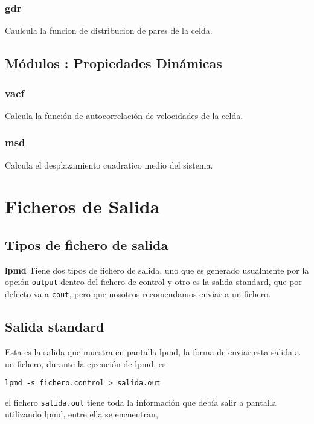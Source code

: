 \documentclass[a4paper,10pt]{scrbook}
\newcommand{\lpmd}{\textbf{lpmd }}
\newcommand{\control}[1]{\begin{center}\begin{minipage}{10cm}\texttt{#1}\end{minipage}\end{center}}
\begin{document}
\subsubsection{gdr}
Caulcula la funcion de distribucion de pares de la celda.

\subsection{M\'odulos : Propiedades Din\'amicas}
\subsubsection{vacf}
Calcula la funci\'on de autocorrelaci\'on de velocidades de la celda.
\subsubsection{msd}
Calcula el desplazamiento cuadratico medio del sistema.

\section{Ficheros de Salida}

\subsection{Tipos de fichero de salida}
\lpmd Tiene dos tipos de fichero de salida, uno que es generado usualmente por la opci\'on \verb|output| dentro del fichero de control y otro es la salida standard, que por defecto va a \verb|cout|, pero que nosotros recomendamos enviar a un fichero.

\subsection{Salida standard}
Esta es la salida que muestra en pantalla lpmd, la forma de enviar esta salida a un fichero, durante la ejecuci\'on de lpmd, es

\control{lpmd -s fichero.control > salida.out}

el fichero \verb|salida.out| tiene toda la informaci\'on que deb\'ia salir a pantalla utilizando lpmd, entre ella se encuentran,
\end{document}

